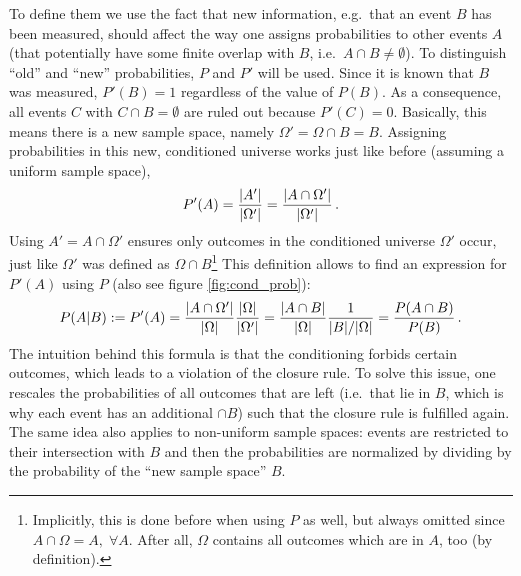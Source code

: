 To define them we use the fact that new information, e.g.~that an event $B$ has been measured, should affect the way one assigns probabilities to other events $A$ (that potentially have some finite overlap with $B$, i.e.~$A \cap B \neq \emptyset$). To distinguish \enquote{old} and \enquote{new} probabilities, $P$ and $P'$ will be used. Since it is known that $B$ was measured, $P'(B) = 1$ regardless of the value of $P(B)$. As a consequence, all events $C$ with $C \cap B = \emptyset$ are ruled out because $P'(C) = 0$. Basically, this means there is a new sample space, namely $\Omega' = \Omega \cap B = B$. Assigning probabilities in this new, conditioned universe works just like before (assuming a uniform sample space),
\begin{equation*}
P'(A) = \frac{\abs{A'}}{\abs{\Omega'}} = \frac{\abs{A \cap \Omega'}}{\abs{\Omega'}} \, .
\end{equation*}
Using $A' = A \cap \Omega'$ ensures only outcomes in the conditioned universe $\Omega'$ occur, just like $\Omega'$ was defined as $\Omega \cap B$\footnote{Implicitly, this is done before when using $P$ as well, but always omitted since $A \cap \Omega = A, \; \forall A$. After all, $\Omega$ contains all outcomes which are in $A$, too (by definition).} This definition allows to find an expression for $P'(A)$ using $P$ (also see figure \ref{fig:cond_prob}):
\begin{equation}
P(A | B) := P'(A) = \frac{\abs{A \cap \Omega'}}{\abs{\Omega}} \frac{\abs{\Omega}}{\abs{\Omega'}} = \frac{\abs{A \cap B}}{\abs{\Omega}} \frac{1}{\abs{B} / \abs{\Omega}} = \frac{P(A \cap B)}{P(B)} \, .
\end{equation}
The intuition behind this formula is that the conditioning forbids certain outcomes, which leads to a violation of the closure rule. To solve this issue, one rescales the probabilities of all outcomes that are left (i.e.~that lie in $B$, which is why each event has an additional $\cap B$) such that the closure rule is fulfilled again. The same idea also applies to non-uniform sample spaces: events are restricted to their intersection with $B$ and then the probabilities are normalized by dividing by the probability of the \enquote{new sample space} $B$.



